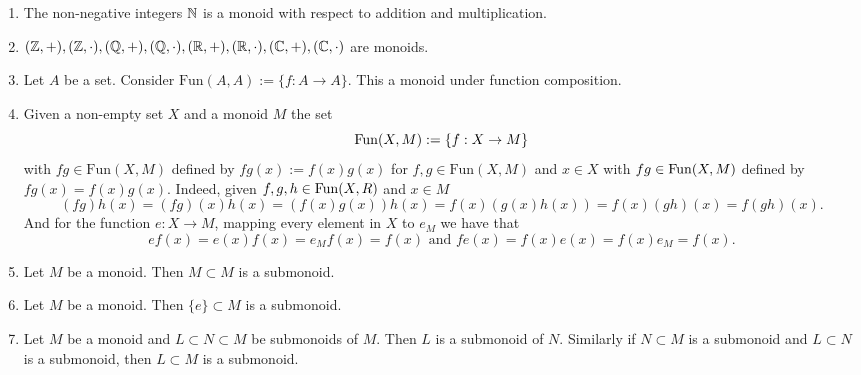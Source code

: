 \begin{example}\label{SubMonoidsExample}
    \begin{enumerate}
        \item The non-negative integers $\mathbb{N}$ is a monoid with respect to addition and multiplication. 
        \item $(\mathbb{Z},+),(\mathbb{Z},\cdot),(\mathbb{Q},+),(\mathbb{Q},\cdot),(\mathbb{R},+),(\mathbb{R},\cdot),(\mathbb{C},+),(\mathbb{C},\cdot)$ are monoids.
        \item Let $A$ be a set. Consider $\text{Fun}(A,A) := \{f:A\rightarrow A\}$. This a monoid under function composition.
        \item Given a non-empty set $X$ and a monoid $M$ the set $$\mathrm{Fun}(X,M):=\left\{ f: X\rightarrow M\right\}$$
        with $fg\in \text{Fun}(X,M)$ defined by $fg(x) := f(x)g(x)$ for $f,g\in \text{Fun}(X,M)$ and $x\in X$
        with $fg\in\mathrm{Fun}(X,M) $ defined by $fg(x) = f(x)g(x)$. Indeed, given $f,g,h\in \mathrm{Fun}(X,R)$ and $x\in M$
        $$(fg)h(x)=(fg)(x)h(x)=(f(x)g(x))h(x)= f(x)(g(x)h(x))=f(x)(gh)(x)=f(gh)(x).$$
        And for the function $e : X \rightarrow M$, mapping every element in $X$ to $e_M$ we have that 
        $$ef(x) = e(x)f(x) = e_Mf(x) = f(x) \text{ and } fe(x)=f(x)e(x)=f(x)e_M = f(x).$$
        \item Let $M$ be a monoid. Then $M\subset M$ is a submonoid. 
        \item Let $M$ be a monoid. Then $\{e\}\subset M$ is a submonoid.
        \item Let $M$ be a monoid and $L\subset N\subset M$ be submonoids of $M$. Then $L$ is a submonoid of $N$. Similarly if $N\subset M$ is a submonoid and $L\subset N$ is a submonoid, then $L\subset M$ is a submonoid. 
        
    \end{enumerate}
\end{example}
